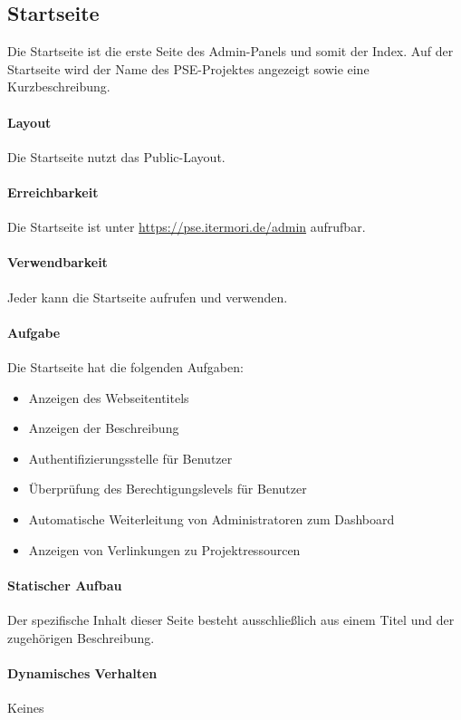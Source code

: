 \subsection{Startseite}

Die Startseite ist die erste Seite des Admin-Panels und somit der Index.
Auf der Startseite wird der Name des PSE-Projektes angezeigt sowie eine Kurzbeschreibung.

\paragraph*{Layout}
Die Startseite nutzt das Public-Layout.

\paragraph*{Erreichbarkeit}
Die Startseite ist unter \href{https://pse.itermori.de/admin}{https://pse.itermori.de/admin} aufrufbar.

\paragraph*{Verwendbarkeit}
Jeder kann die Startseite aufrufen und verwenden.

\paragraph{Aufgabe}
Die Startseite hat die folgenden Aufgaben:

\begin{itemize}
    \item Anzeigen des Webseitentitels
    \item Anzeigen der Beschreibung
    \item Authentifizierungsstelle für Benutzer
    \item Überprüfung des Berechtigungslevels für Benutzer
    \item Automatische Weiterleitung von Administratoren zum Dashboard
    \item Anzeigen von Verlinkungen zu Projektressourcen
\end{itemize}

\paragraph*{Statischer Aufbau}
Der spezifische Inhalt dieser Seite besteht ausschließlich aus einem Titel und der zugehörigen Beschreibung.

\paragraph*{Dynamisches Verhalten}
Keines